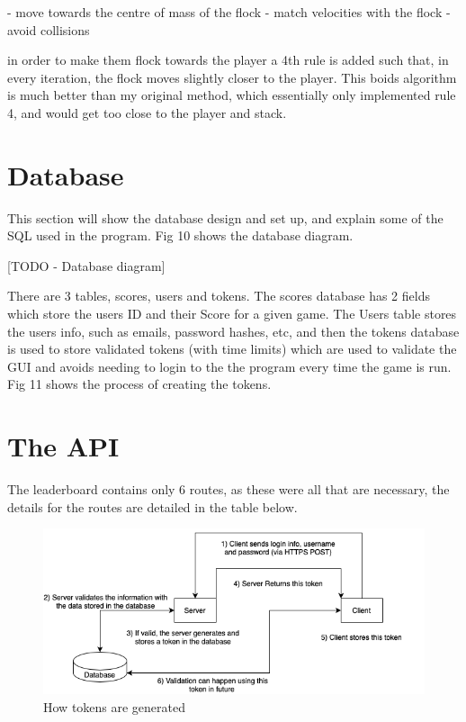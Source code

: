 \documentclass[a4paper, 11pt]{report}
\begin{document}
    - move towards the centre of mass of the flock
    - match velocities with the flock
    - avoid collisions
    
in order to make them flock towards the player a 4th rule is added such that, in every iteration, the flock moves slightly closer to the player. This boids algorithm is much better than my original method, which essentially only implemented rule 4, and would get too close to the player and stack.



\section{Database}
This section will show the database design and set up, and explain some of the SQL used in the program. Fig 10 shows the database diagram.


[TODO - Database diagram]


There are 3 tables, scores, users and tokens. The scores database has 2 fields which store the users ID and their Score for a given game. The Users table stores the users info, such as emails, password hashes, etc, and then the tokens database is used to store validated tokens (with time limits) which are used to validate the GUI and avoids needing to login to the the program every time the game is run. Fig 11 shows the process of creating the tokens.

\section{The API}
The leaderboard contains only 6 routes, as these were all that are necessary, the details for the routes are detailed in the table below.

\begin{figure}[!ht]
  \includegraphics[width=0.8\linewidth]{tokens.png}
  \centering
  \caption{How tokens are generated}
  \label{fig:tokens}
\end{figure}
\end{document}
